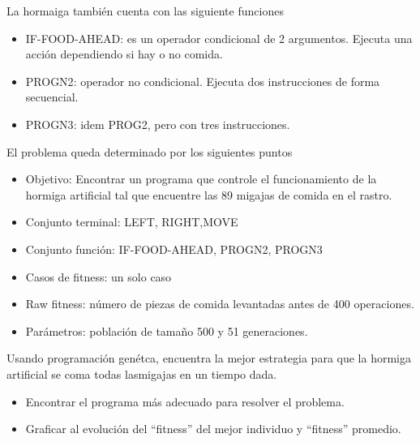 \documentclass[twocolumn]{article}
\begin{document}
La hormaiga también cuenta con las siguiente funciones

\begin{itemize}
  \item \textsc{IF-FOOD-AHEAD}: es un operador condicional de 2 argumentos.
    Ejecuta una acción dependiendo si hay o no comida.
  \item \textsc{PROGN2}: operador no condicional. Ejecuta dos instrucciones de
    forma secuencial.
  \item \textsc{PROGN3}: idem \textsc{PROG2}, pero con tres instrucciones.
\end{itemize}

El problema queda determinado por los siguientes puntos

\begin{itemize}
  \item Objetivo: Encontrar un programa que controle el funcionamiento de la
    hormiga artificial tal que encuentre las 89 migajas de comida en el rastro.
  \item Conjunto terminal: \textsc{LEFT, RIGHT,MOVE}
  \item Conjunto función: \textsc{IF-FOOD-AHEAD, PROGN2, PROGN3}
  \item Casos de fitness: un solo caso
  \item Raw fitness: número de piezas de comida levantadas antes de 400
    operaciones.
  \item Parámetros: población de tamaño 500 y 51 generaciones.
\end{itemize}

Usando programación genétca, encuentra la mejor estrategia para que la hormiga
artificial se coma todas lasmigajas en un tiempo dada.

\begin{itemize}
  \item Encontrar el programa más adecuado para resolver el problema.
  \item Graficar al evolución del ``fitness'' del mejor individuo y
    ``fitness'' promedio.
\end{itemize}
\end{document}
